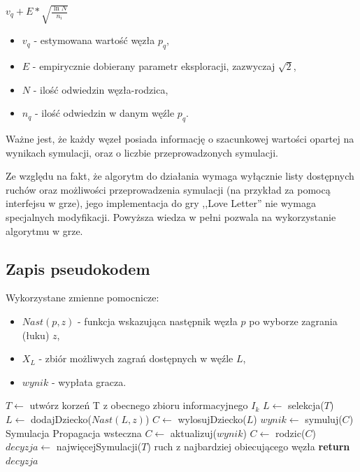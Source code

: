\begin{center}
	${v_q} + E*\sqrt{\frac{\ln{N}}{n_i}}$
\end{center}
\begin{itemize}
	\item $v_q$ - estymowana wartość węzła $p_q$,
	\item $E$ - empirycznie dobierany parametr eksploracji, zazwyczaj $\sqrt{2}$,
	\item $N$ - ilość odwiedzin węzła-rodzica,
	\item $n_q$ - ilość odwiedzin w danym węźle $p_q$.
\end{itemize}
Ważne jest, że każdy węzeł posiada informację o szacunkowej wartości opartej na wynikach symulacji, oraz o liczbie przeprowadzonych symulacji.

Ze względu na fakt, że algorytm do działania wymaga wyłącznie listy dostępnych ruchów oraz możliwości przeprowadzenia symulacji (na przykład za pomocą interfejsu w grze), jego implementacja do gry ,,Love Letter'' nie wymaga specjalnych modyfikacji. Powyższa wiedza w pełni pozwala na wykorzystanie algorytmu w grze.
\subsection{Zapis pseudokodem}
Wykorzystane zmienne pomocnicze:
\begin{itemize}
	\item $Nast(p, z)$ - funkcja wskazująca następnik węzła $p$ po wyborze zagrania (łuku) $z$,
	\item $X_L$ - zbiór możliwych zagrań dostępnych w węźle $L$,
	\item $wynik$ - wypłata gracza.
\end{itemize}
\begin{algorithmic}[1]
		\State $T \gets $ utwórz korzeń T z obecnego zbioru informacyjnego $I_k$
		\Repeat
			\State $L \gets $ selekcja($T$)
					\State $L \gets$ dodajDziecko($Nast(L, z)$)
				\EndFor
				\State $C \gets$ wylosujDziecko($L$)
				\State $wynik \gets$ symuluj($C$)	\Comment Symulacja
				\Repeat	\Comment Propagacja wsteczna
					\State $C \gets $ aktualizuj($wynik$)
					\State $C \gets $ rodzic($C$)
			\EndIf 
		\State $decyzja \gets$ najwięcejSymulacji($T$) \Comment ruch z najbardziej obiecującego węzła 
		\State \textbf{return} $decyzja$
	\EndFunction
\end{algorithmic}